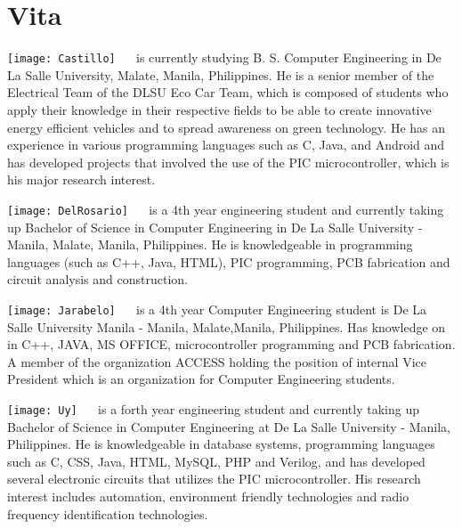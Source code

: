 \chapter{Vita}



\texttt{[image: Castillo]}
 \  \ is currently studying B. S. Computer Engineering in De La Salle University, Malate, Manila, Philippines. He is a senior member of the Electrical Team of the DLSU Eco Car Team, which is composed of students who apply their knowledge in their respective fields to be able to create innovative energy efficient vehicles and to spread awareness on green technology. He has an experience in various programming languages such as C, Java, and Android and has developed projects that involved the use of the PIC microcontroller, which is his major research interest. 

\texttt{[image: DelRosario]}
 \  \ is a 4th year engineering student and currently taking up Bachelor of Science in Computer Engineering in De La Salle University - Manila, Malate, Manila, Philippines. He is knowledgeable in programming languages (such as C++, Java, HTML), PIC programming, PCB fabrication and circuit analysis and construction.

\texttt{[image: Jarabelo]}
 \  \ is a 4th year Computer Engineering student is De La Salle University Manila - Manila, Malate,Manila, Philippines. Has knowledge on in C++, JAVA, MS OFFICE, microcontroller programming and PCB fabrication. A member of the organization ACCESS holding the position of internal Vice President which is an organization for Computer Engineering students. 

\texttt{[image: Uy]}
 \  \ is a forth year engineering student and currently taking up Bachelor of Science in Computer Engineering at De La Salle University - Manila, Philippines. He is knowledgeable in database systems, programming languages such as C, CSS, Java, HTML, MySQL, PHP and Verilog, and has developed several electronic circuits that utilizes the PIC microcontroller. His research interest includes automation, environment friendly technologies and radio frequency identification technologies.


